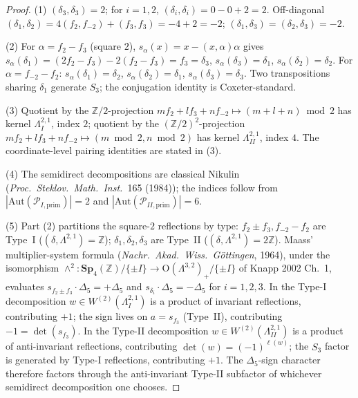 \begin{proof}
(1) $(\delta_3, \delta_3) = 2$; for $i = 1, 2$,
$(\delta_i, \delta_i) = 0 - 0 + 2 = 2$. Off-diagonal
$(\delta_1, \delta_2) = 4(f_2, f_{-2}) + (f_3, f_3) = -4 + 2 = -2$;
$(\delta_1, \delta_3) = (\delta_2, \delta_3) = -2$.

(2) For $\alpha = f_2 - f_3$ (square $2$), $s_\alpha(x) = x - (x,\alpha)\alpha$
gives $s_\alpha(\delta_1) = (2f_2 - f_3) - 2(f_2 - f_3) = f_3 = \delta_3$,
$s_\alpha(\delta_3) = \delta_1$, $s_\alpha(\delta_2) = \delta_2$.
For $\alpha = f_{-2} - f_2$: $s_\alpha(\delta_1) = \delta_2$,
$s_\alpha(\delta_2) = \delta_1$, $s_\alpha(\delta_3) = \delta_3$.
Two transpositions sharing $\delta_1$ generate $S_3$; the conjugation
identity is Coxeter-standard.

(3) Quotient by the $\mathbb{Z}/2$-projection
$m f_2 + l f_3 + n f_{-2} \mapsto (m+l+n) \bmod 2$ has kernel
$\Lambda^{2,1}_I$, index $2$; quotient by the
$(\mathbb{Z}/2)^2$-projection
$m f_2 + l f_3 + n f_{-2} \mapsto (m \bmod 2, n \bmod 2)$ has kernel
$\Lambda^{2,1}_{II}$, index $4$. The coordinate-level pairing
identities are stated in (3).

(4) The semidirect decompositions are classical Nikulin
(\emph{Proc.\ Steklov.\ Math.\ Inst.}~165 (1984)); the indices follow
from $|\mathrm{Aut}(\mathcal{P}_{I,\mathrm{prim}})| = 2$ and
$|\mathrm{Aut}(\mathcal{P}_{II,\mathrm{prim}})| = 6$.

(5) Part (2) partitions the square-$2$ reflections by type:
$f_2 \pm f_3, f_{-2} - f_2$ are Type~I ($(\delta, \Lambda^{2,1})
= \mathbb{Z}$); $\delta_1, \delta_2, \delta_3$ are Type~II
($(\delta, \Lambda^{2,1}) = 2\mathbb{Z}$). Maass' multiplier-system
formula (\emph{Nachr.\ Akad.\ Wiss.\ G\"ottingen}, 1964), under the
isomorphism $\wedge^2: \mathbf{Sp}_4(\mathbb{Z})/\{\pm I\} \to
\mathrm{O}(\Lambda^{3,2})_+/\{\pm I\}$ of Knapp 2002 Ch.~1, evaluates
$s_{f_2 \pm f_3}\cdot \Delta_5 = +\Delta_5$ and
$s_{\delta_i}\cdot \Delta_5 = -\Delta_5$ for $i = 1, 2, 3$. In the
Type-I decomposition $w \in W^{(2)}(\Lambda^{2,1}_I)$ is a product of
invariant reflections, contributing $+1$; the sign lives on
$a = s_{f_3}$ (Type~II), contributing $-1 = \det(s_{f_3})$. In the
Type-II decomposition $w \in W^{(2)}(\Lambda^{2,1}_{II})$ is a
product of anti-invariant reflections, contributing
$\det(w) = (-1)^{\ell(w)}$; the $S_3$ factor is generated by Type-I
reflections, contributing $+1$. The $\Delta_5$-sign character
therefore factors through the anti-invariant Type-II subfactor of
whichever semidirect decomposition one chooses.
\end{proof}

